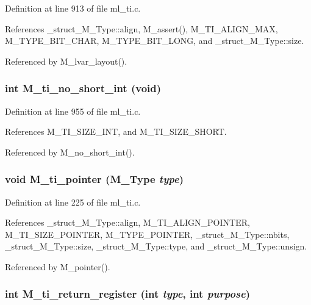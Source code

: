 Definition at line 913 of file ml\_\-ti.c.

References \_\-struct\_\-M\_\-Type::align, M\_\-assert(), M\_\-TI\_\-ALIGN\_\-MAX, M\_\-TYPE\_\-BIT\_\-CHAR, M\_\-TYPE\_\-BIT\_\-LONG, and \_\-struct\_\-M\_\-Type::size.

Referenced by M\_\-lvar\_\-layout().
\subsubsection{\setlength{\rightskip}{0pt plus 5cm}int M\_\-ti\_\-no\_\-short\_\-int (void)}\label{m__ti_8h_b057548a4ac1ff3213dec888a2e586ce}




Definition at line 955 of file ml\_\-ti.c.

References M\_\-TI\_\-SIZE\_\-INT, and M\_\-TI\_\-SIZE\_\-SHORT.

Referenced by M\_\-no\_\-short\_\-int().
\subsubsection{\setlength{\rightskip}{0pt plus 5cm}void M\_\-ti\_\-pointer (\bf{M\_\-Type} {\em type})}\label{m__ti_8h_7eed50174a4457c9d4a930ca39cef920}




Definition at line 225 of file ml\_\-ti.c.

References \_\-struct\_\-M\_\-Type::align, M\_\-TI\_\-ALIGN\_\-POINTER, M\_\-TI\_\-SIZE\_\-POINTER, M\_\-TYPE\_\-POINTER, \_\-struct\_\-M\_\-Type::nbits, \_\-struct\_\-M\_\-Type::size, \_\-struct\_\-M\_\-Type::type, and \_\-struct\_\-M\_\-Type::unsign.

Referenced by M\_\-pointer().
\subsubsection{\setlength{\rightskip}{0pt plus 5cm}int M\_\-ti\_\-return\_\-register (int {\em type}, int {\em purpose})}\label{m__ti_8h_ee0194d8749361e7c94fb0415ac622a2}




